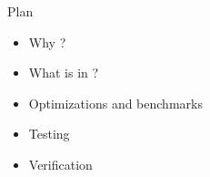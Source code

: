 

\begin{frame}{Plan}
  
 \begin{itemize}[label=]
     \item Why \Saturn ?
     \item What is in \Saturn ?
     \item Optimizations and benchmarks
     \item Testing
     \item Verification
 \end{itemize}   
 
\end{frame}